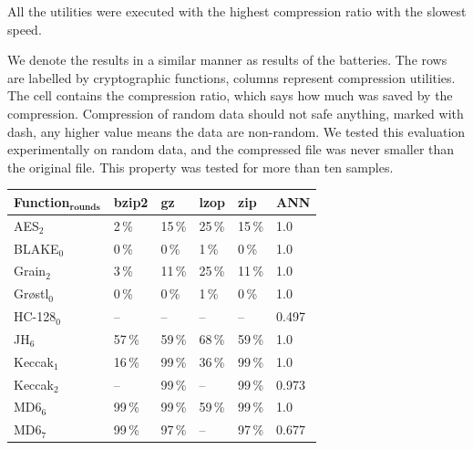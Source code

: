 \documentclass[
    digital,    %
    oneside,    %
    color,
    11pt,
    nocover,
    notable,
    nolof,
    nolot,
]{fithesis3}
\newcommand{\fd}{\cellcolor{red!25}}
\newcommand{\fn}{}
\begin{document}
All the utilities were executed with the highest compression ratio with the slowest speed.

We denote the results in a similar manner as results of the batteries. The rows are labelled by cryptographic functions, columns represent compression utilities. The cell contains the compression ratio, which says how much was saved by the compression. Compression of random data should not safe anything, marked with dash, any higher value means the data are non-random. We tested this evaluation experimentally on random data, and the compressed file was never smaller than the original file. This property was tested for more than ten samples.

\begin{table}[t]
\centering

\begin{tabular}{@{}l|lllll}
\textbf{\large Function$_{\textbf{rounds}}$} & 
\multicolumn{1}{R{1.1cm}}{\textbf{bzip2}} &
\multicolumn{1}{R{1.1cm}}{\textbf{gz}} &
\multicolumn{1}{R{1.1cm}}{\textbf{lzop}} &
\multicolumn{1}{R{1.1cm}}{\textbf{zip}} &
\multicolumn{1}{R{1.1cm}}{\textbf{ANN}} \\ \hline
AES$_{2}$                        & 2\,\%  \fd & 15\,\% \fd & 25\,\% \fd & 15\,\% \fd & 1.0   \fd \\ \hline
BLAKE$_{0}$                      & 0\,\%  \fd & 0\,\%  \fd & 1\,\%  \fd & 0\,\%  \fd & 1.0   \fd \\ \hline
Grain$_{2}$                      & 3\,\%  \fd & 11\,\% \fd & 25\,\% \fd & 11\,\% \fd & 1.0   \fd \\ \hline
Gr\o{}stl$_{0}$                  & 0\,\%  \fd & 0\,\%  \fd & 1\,\%  \fd & 0\,\%  \fd & 1.0   \fd \\ \hline
HC-128$_{0}$                     & --     \fn & --     \fn & --     \fn & --     \fn & 0.497 \fn \\ \hline
JH$_{6}$                         & 57\,\% \fd & 59\,\% \fd & 68\,\% \fd & 59\,\% \fd & 1.0   \fd \\ \hline
Keccak$_{1}$                     & 16\,\% \fd & 99\,\% \fd & 36\,\% \fd & 99\,\% \fd & 1.0   \fd \\
Keccak$_{2}$                     & --     \fn & 99\,\% \fd & --     \fn & 99\,\% \fd & 0.973 \fd \\ \hline
MD6$_{6}$                        & 99\,\% \fd & 99\,\% \fd & 59\,\% \fd & 99\,\% \fd & 1.0   \fd \\
MD6$_{7}$                        & 99\,\% \fd & 97\,\% \fd & --     \fn & 97\,\% \fd & 0.677 \fd \\ \hline

\end{tabular}
\end{table}
\end{document}
